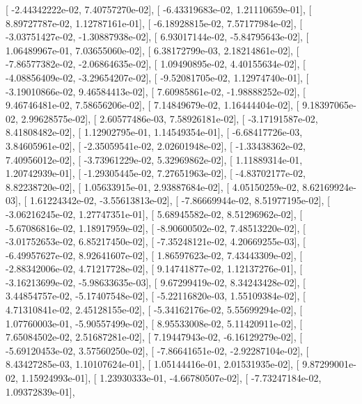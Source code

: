 \documentclass{article}
\begin{document}
       [ -2.44342222e-02,   7.40757270e-02],
       [ -6.43319683e-02,   1.21110659e-01],
       [  8.89727787e-02,   1.12787161e-01],
       [ -6.18928815e-02,   7.57177984e-02],
       [ -3.03751427e-02,  -1.30887938e-02],
       [  6.93017144e-02,  -5.84795643e-02],
       [  1.06489967e-01,   7.03655060e-02],
       [  6.38172799e-03,   2.18214861e-02],
       [ -7.86577382e-02,  -2.06864635e-02],
       [  1.09490895e-02,   4.40155634e-02],
       [ -4.08856409e-02,  -3.29654207e-02],
       [ -9.52081705e-02,   1.12974740e-01],
       [ -3.19010866e-02,   9.46584413e-02],
       [  7.60985861e-02,  -1.98888252e-02],
       [  9.46746481e-02,   7.58656206e-02],
       [  7.14849679e-02,   1.16444404e-02],
       [  9.18397065e-02,   2.99628575e-02],
       [  2.60577486e-03,   7.58926181e-02],
       [ -3.17191587e-02,   8.41808482e-02],
       [  1.12902795e-01,   1.14549354e-01],
       [ -6.68417726e-03,   3.84605961e-02],
       [ -2.35059541e-02,   2.02601948e-02],
       [ -1.33438362e-02,   7.40956012e-02],
       [ -3.73961229e-02,   5.32969862e-02],
       [  1.11889314e-01,   1.20742939e-01],
       [ -1.29305445e-02,   7.27651963e-02],
       [ -4.83702177e-02,   8.82238720e-02],
       [  1.05633915e-01,   2.93887684e-02],
       [  4.05150259e-02,   8.62169924e-03],
       [  1.61224342e-02,  -3.55613813e-02],
       [ -7.86669944e-02,   8.51977195e-02],
       [ -3.06216245e-02,   1.27747351e-01],
       [  5.68945582e-02,   8.51296962e-02],
       [ -5.67086816e-02,   1.18917959e-02],
       [ -8.90600502e-02,   7.48513220e-02],
       [ -3.01752653e-02,   6.85217450e-02],
       [ -7.35248121e-02,   4.20669255e-03],
       [ -6.49957627e-02,   8.92641607e-02],
       [  1.86597623e-02,   7.43443309e-02],
       [ -2.88342006e-02,   4.71217728e-02],
       [  9.14741877e-02,   1.12137276e-01],
       [ -3.16213699e-02,  -5.98633635e-03],
       [  9.67299419e-02,   8.34243428e-02],
       [  3.44854757e-02,  -5.17407548e-02],
       [ -5.22116820e-03,   1.55109384e-02],
       [  4.71310841e-02,   2.45128155e-02],
       [ -5.34162176e-02,   5.55699294e-02],
       [  1.07760003e-01,  -5.90557499e-02],
       [  8.95533008e-02,   5.11420911e-02],
       [  7.65084502e-02,   2.51687281e-02],
       [  7.19447943e-02,  -6.16129279e-02],
       [ -5.69120453e-02,   3.57560250e-02],
       [ -7.86641651e-02,  -2.92287104e-02],
       [  8.43427285e-03,   1.10107624e-01],
       [  1.05144416e-01,   2.01531935e-02],
       [  9.87299001e-02,   1.15924993e-01],
       [  1.23930333e-01,  -4.66780507e-02],
       [ -7.73247184e-02,   1.09372839e-01],
\end{document}
